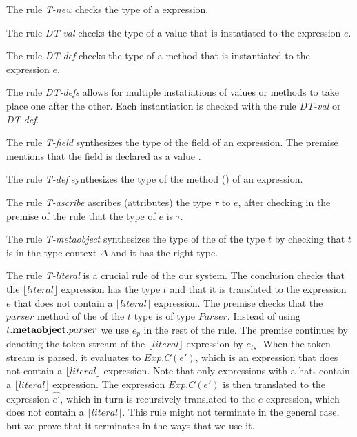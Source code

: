 The rule \textit{T-new} checks the type of a  expression. 

The rule \textit{DT-val} checks the type of a value that is instatiated to the expression $e$.

The rule \textit{DT-def} checks the type of a method  that is instantiated to the expression $e$.

The rule \textit{DT-defs} allows for multiple instatiations of values or methods to take place one after the other. Each instantiation is checked with the rule \textit{DT-val} or \textit{DT-def}.

The rule \textit{T-field} synthesizes the type of the field of an expression. The premise mentions that the field is declared as a value .

The rule \textit{T-def}  synthesizes the type of the method () of an expression. 

The rule \textit{T-ascribe} ascribes (attributes) the type $\tau$ to $e$, after checking in the premise of the rule that the type of $e$ is $\tau$.

The rule \textit{T-metaobject} synthesizes the type of the  of the type $t$ by checking that $t$ is in the type context $\Delta$ and it has the right type.

The rule \textit{T-literal} is a crucial rule of the our system. The conclusion checks that the $\lfloor literal \rfloor$ expression has the type $t$ and that it is translated to the expression $e$ that does not contain a $\lfloor literal \rfloor$ expression. The premise checks that the $parser$ method of the  of the $t$ type is of type $Parser$. Instead of using $t.\textbf{metaobject}.parser$ we use $e_p$ in the rest of the rule. The premise continues by denoting the token stream of the $\lfloor literal \rfloor$ expression by $e_{ts}$. When the token stream is parsed, it evaluates to $Exp.C(e')$, which is an expression that does not contain a $\lfloor literal \rfloor$ expression. Note that only expressions with a hat $\hat{}$ contain a $\lfloor literal \rfloor$ expression. The expression $Exp.C(e')$ is then translated to the expression $\hat{e'}$, which in turn is recursively translated to the $e$ expression, which does not contain a $\lfloor literal \rfloor$. This rule might not terminate in the general case, but we prove that it terminates in the ways that we use it.















